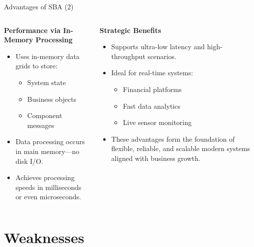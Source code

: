 \documentclass[aspectratio=169, table]{beamer}
\begin{document}
	\begin{frame}{Advantages of SBA (2)}
		\vspace{20pt}
		\begin{columns}[t]
			\begin{column}{0.5\textwidth}
				\textbf{Performance via In-Memory Processing}
				\begin{itemize}
					\item Uses in-memory data grids to store:
					\begin{itemize}
						\item System state
						\item Business objects
						\item Component messages
					\end{itemize}
					\item Data processing occurs in main memory—no disk I/O.
					\item Achieves processing speeds in milliseconds or even microseconds.
				\end{itemize}
			\end{column}
			
			\begin{column}{0.5\textwidth}
				\textbf{Strategic Benefits}
				\begin{itemize}
					\item Supports ultra-low latency and high-throughput scenarios.
					\item Ideal for real-time systems:
					\begin{itemize}
						\item Financial platforms
						\item Fast data analytics
						\item Live sensor monitoring
					\end{itemize}
					\item These advantages form the foundation of flexible, reliable, and scalable modern systems aligned with business growth.
				\end{itemize}
			\end{column}
		\end{columns}
	\end{frame}
	
	\section{Weaknesses}
	
\end{document}
